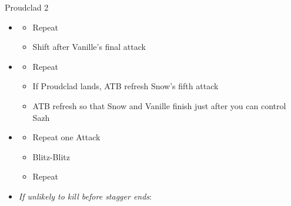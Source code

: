 \begin{battle}[2:01]{Proudclad 2}
\begin{multicols}{2}
\begin{itemize}
\begin{itemize}
\begin{itemize}
                      \item Auto-chain 2 spells
                      \item Cold Blood
                    \end{itemize}
              \item \textit{Muon Blaster $\rightarrow$ Oneiric Maelstrom}
                    \begin{itemize}
                      \item Renew to prevent Sazh from Launching
                      \item Cold Blood
                    \end{itemize}
              \item \textit{Muon Blaster $\rightarrow$ Muon Blaster}
                    \begin{itemize}
                      \item Cold Blood to prevent Sazh's interruption
                    \end{itemize}
              \item ATB refresh after Cold Blood starts to maximize Launches
            \end{itemize}
      \item \fifth
            \begin{itemize}
              \item Repeat
              \item Shift after Vanille's final attack
            \end{itemize}
      \item \first
            \begin{itemize}
              \item Repeat
              \item If Proudclad lands, ATB refresh Snow's fifth attack
              \item ATB refresh so that Snow and Vanille finish just after you can control Sazh
            \end{itemize}
      \item \second
            \begin{itemize}
              \item Repeat one Attack
              \item Blitz-Blitz
              \item Repeat
            \end{itemize}
            \columnbreak
      \item \textit{If unlikely to kill before stagger ends}:

\end{itemize}
\end{multicols}
\end{battle}

